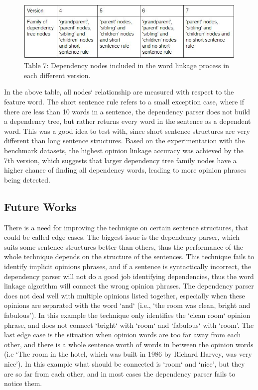 \documentclass{sig-alternate}
\begin{document}
\begin{figure}
\centering
\includegraphics[scale=0.65]{images/table7.JPG}
Table 7: Dependency nodes included in the word linkage process in each different version.
\end{figure}

In the above table, all nodes` relationship are measured with respect to the feature word. The short sentence rule refers to a small exception case, where if there are less than 10 words in a sentence, the dependency parser does not build a dependency tree, but rather returns every word in the sentence as a dependent word. This was a good idea to test with, since short sentence structures are very different than long sentence structures. Based on the experimentation with the benchmark datasets, the highest opinion linkage accuracy was achieved by the 7th version, which suggests that larger dependency tree family nodes have a higher chance of finding all dependency words, leading to more opinion phrases being detected.

\subsection{Future Works}
There is a need for improving the technique on certain sentence structures, that could be called edge cases. The biggest issue is the dependency parser, which suits some sentence structures better than others, thus the performance of the whole technique depends on the structure of the sentences. This technique fails to identify implicit opinions phrases, and if a sentence is syntactically incorrect, the dependency parser will not do a good job identifying dependencies, thus the word linkage algorithm will connect the wrong opinion phrases. The dependency parser does not deal well with multiple opinions listed together, especially when these opinions are separated with the word `and` (i.e., `the room was clean, bright and fabulous'). In this example the technique only identifies the `clean room` opinion phrase, and does not connect `bright` with `room` and `fabulous` with `room'. The last edge case is the situation when opinion words are too far away from each other, and there is a whole sentence worth of words in between the opinion words (i.e `The room in the hotel, which was built in 1986 by Richard Harvey, was very nice'). In this example what should be connected is `room` and `nice', but they are so far from each other, and in most cases the dependency parser fails to notice them.
\end{document}
